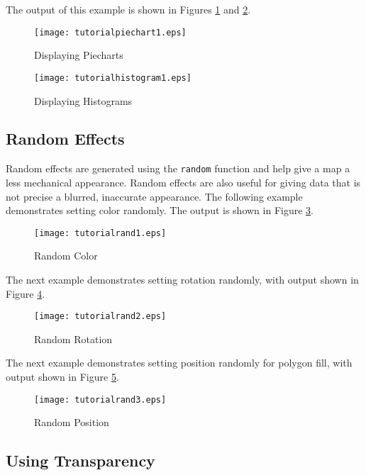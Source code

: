 The output of this example is shown in Figures
\ref{tutorialpiechart1}
and
\ref{tutorialhistogram1}.



\begin{figure}[htb]
\texttt{[image: tutorialpiechart1.eps]}
\caption{Displaying Piecharts}
\label{tutorialpiechart1}
\end{figure}

\begin{figure}[htb]
\texttt{[image: tutorialhistogram1.eps]}
\caption{Displaying Histograms}
\label{tutorialhistogram1}
\end{figure}

\subsection{Random Effects}

Random effects are generated using the \texttt{random}
function and help give a map a less mechanical appearance.
Random effects are also useful for giving data that is not
precise a blurred, inaccurate appearance.
The following example demonstrates setting color randomly.
The output is shown in Figure \ref{tutorialrand1}.



\begin{figure}[htb]
\texttt{[image: tutorialrand1.eps]}
\caption{Random Color}
\label{tutorialrand1}
\end{figure}

The next example demonstrates setting rotation randomly, with output shown in
Figure \ref{tutorialrand2}.



\begin{figure}[htb]
\texttt{[image: tutorialrand2.eps]}
\caption{Random Rotation}
\label{tutorialrand2}
\end{figure}

The next example demonstrates setting position randomly for polygon fill, with
output shown in Figure \ref{tutorialrand3}.



\begin{figure}[htb]
\texttt{[image: tutorialrand3.eps]}
\caption{Random Position}
\label{tutorialrand3}
\end{figure}

\subsection{Using Transparency}

